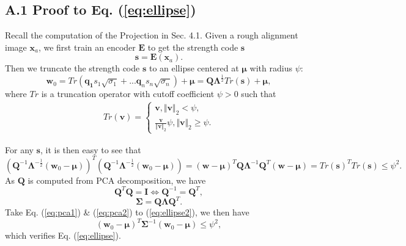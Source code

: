 \documentclass[10pt,twocolumn,letterpaper]{article}
\newcommand{\w}{\bm{w}}
\newcommand{\x}{\bm{x}}
\begin{document}
\subsection*{A.1 Proof to Eq. (\ref{eq:ellipse})}
Recall the computation of the Projection in Sec. 4.1. Given a rough alignment image $\x_a$, we first train an encoder $\bm{E}$ to get the strength code $\bm{s}$
\begin{equation}
    \bm{s}=\bm{E}(\x_a).
\end{equation}
Then we truncate the strength code $\bm{s}$ to an ellipse centered at $\bm{\mu}$ with radius $\psi$:
\begin{equation}
    \w_0=Tr(\bm{q_1}s_1\sqrt{\sigma_1}+...\bm{q}_n s_n\sqrt{\sigma_n})+\bm{\mu}=\bm{Q}\bm{\Lambda}^{\frac{1}{2}}Tr(\bm{s})+\bm{\mu},
\end{equation}
where $Tr$ is a truncation operator with cutoff coefficient $\psi>0$ such that
\begin{align}
Tr(\bm{v})=
\left\{\begin{array}{ll}
     \bm{v}, \Vert \bm{v}\Vert_2<\psi,\\
     \frac{\bm{v}}{\Vert\bm{v}\Vert_2}\psi, \Vert \bm{v}\Vert_2\geq\psi.
\end{array}\right.
\end{align}

For any $\bm{s}$, it is then easy to see that
\begin{equation}\label{eq:ellipse2}
    (\bm{Q}^{-1}\bm{\Lambda}^{-\frac{1}{2}}(\w_0-\bm{\mu}))^T(\bm{Q}^{-1}\bm{\Lambda}^{-\frac{1}{2}}(\w_0-\bm{\mu}))=(\w-\bm{\mu})^T\bm{Q}\bm{\Lambda}^{-1}\bm{Q}^T(\w-\bm{\mu})=Tr(\bm{s})^T Tr(\bm{s})\leq \psi^2.
\end{equation}
As $\bm{Q}$ is computed from PCA decomposition, we have
\begin{equation}\label{eq:pca1}
    \bm{Q}^T\bm{Q}=\bm{I}\Leftrightarrow \bm{Q}^{-1}=\bm{Q}^T,
\end{equation}
\begin{equation}\label{eq:pca2}
    \bm{\Sigma}=\bm{Q}\bm{\Lambda}\bm{Q}^T.
\end{equation}
Take Eq. (\ref{eq:pca1}) \& (\ref{eq:pca2}) to (\ref{eq:ellipse2}), we then have
\begin{equation}
    (\w_0-\bm{\mu})^T\bm{\Sigma}^{-1}(\w_0-\bm{\mu})\leq\psi^2,
\end{equation}
which verifies Eq. (\ref{eq:ellipse}).
\end{document}
